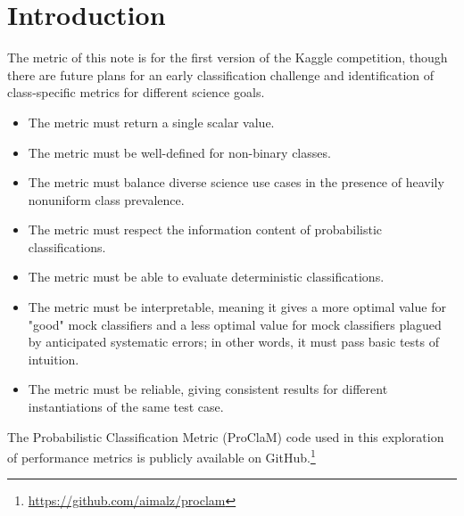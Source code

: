 \section{Introduction}
\label{sec:intro}


The metric of this note is for the first version of the Kaggle competition, though there are future plans for an early classification challenge and identification of class-specific metrics for different science goals.

\begin{itemize}
\item    The metric must return a single scalar value.
\item    The metric must be well-defined for non-binary classes.
\item    The metric must balance diverse science use cases in the presence of heavily nonuniform class prevalence.
\item    The metric must respect the information content of probabilistic classifications.
\item    The metric must be able to evaluate deterministic classifications.
\item    The metric must be interpretable, meaning it gives a more optimal value for "good" mock classifiers and a less optimal value for mock classifiers plagued by anticipated systematic errors; in other words, it must pass basic tests of intuition.
\item    The metric must be reliable, giving consistent results for different instantiations of the same test case.
\end{itemize}

The Probabilistic Classification Metric (ProClaM) code used in this exploration of performance metrics is publicly available on GitHub.\footnote{\url{https://github.com/aimalz/proclam}}
